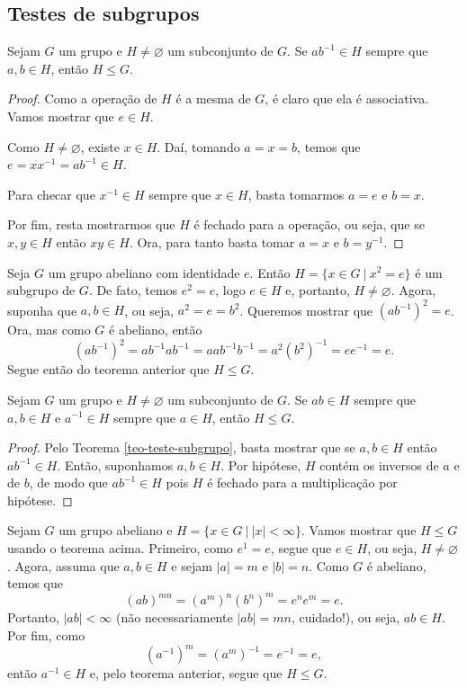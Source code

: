\subsection*{Testes de subgrupos}
%
\begin{theorem}
\label{teo-teste-subgrupo}
    Sejam $G$ um grupo e $H\neq\varnothing$ um subconjunto de $G$. Se $ab^{-1}\in H$ sempre que
    $a,b\in H$, então $H\leq G$.
\end{theorem}
%
\begin{proof}
    Como a operação de $H$ é a mesma de $G$, é claro que ela é associativa. Vamos mostrar que
    $e\in H$.
    
    Como $H\neq\varnothing$, existe $x\in H$. Daí, tomando $a=x=b$, temos que $e = xx^{-1} = ab^{-1}\in H$.
    
    Para checar que $x^{-1}\in H$ sempre que $x\in H$, basta tomarmos $a = e$ e $b = x$. 
    
    Por fim, resta mostrarmos que $H$ é fechado para a operação, ou seja, que se $x,y\in H$
    então $xy\in H$. Ora, para tanto basta tomar $a = x$ e $b = y^{-1}$.
\end{proof}
%
\begin{example}
    Seja $G$ um grupo abeliano com identidade $e$. Então $H = \{x\in G \ | \ x^2 = e\}$ é um subgrupo
    de $G$. De fato, temos $e^2 = e$, logo $e\in H$ e, portanto, $H\neq\varnothing$. Agora, suponha
    que $a,b\in H$, ou seja, $a^2 = e = b^2$. Queremos mostrar que $(ab^{-1})^2 = e$. Ora, mas
    como $G$ é abeliano, então
    \[
    (ab^{-1})^2 = ab^{-1}ab^{-1} = aab^{-1}b^{-1} = a^2(b^2)^{-1} = ee^{-1} = e.
    \]
    Segue então do teorema anterior que $H\leq G$.
\end{example}
%
\begin{theorem}
\label{teo-teste2-subgrupo}
    Sejam $G$ um grupo e $H\neq\varnothing$ um subconjunto de $G$. Se $ab\in H$ sempre
    que $a,b\in H$ e $a^{-1}\in H$ sempre que $a\in H$, então $H\leq G$.
\end{theorem}
%
\begin{proof}
    Pelo Teorema \ref{teo-teste-subgrupo}, basta mostrar que se $a,b\in H$ então $ab^{-1} \in H$.
    Então, suponhamos $a,b\in H$. Por hipótese, $H$ contém os inversos de $a$ e de $b$, de modo que
    $ab^{-1}\in H$ pois $H$ é fechado para a multiplicação por hipótese.
\end{proof}
%
\begin{example}
    Sejam $G$ um grupo abeliano e $H = \{ x\in G \ | \ |x| < \infty \}$. Vamos mostrar que $H\leq G$
    usando o teorema acima. Primeiro, como $e^1 = e$, segue que $e\in H$, ou seja, $H\neq\varnothing$.
    Agora, assuma que $a,b\in H$ e sejam $|a| = m$ e $|b| = n$. Como $G$ é abeliano, temos que
    \[
    (ab)^{mn} = (a^m)^n(b^n)^m = e^ne^m = e.
    \]
    Portanto, $|ab| < \infty$ (não necessariamente $|ab| = mn$, cuidado!), ou seja, $ab\in H$. Por fim,
    como
    \[
    (a^{-1})^m = (a^m)^{-1} = e^{-1} = e,
    \]
    então $a^{-1}\in H$ e, pelo teorema anterior, segue que $H\leq G$.
\end{example}
